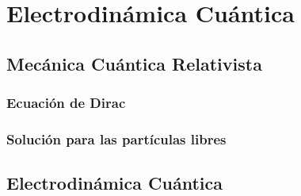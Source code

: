 \chapter{Electrodinámica Cuántica}

\section{Mecánica Cuántica Relativista}

\subsection{Ecuación de Dirac}

\subsection{Solución para las partículas libres}

\section{Electrodinámica Cuántica}

